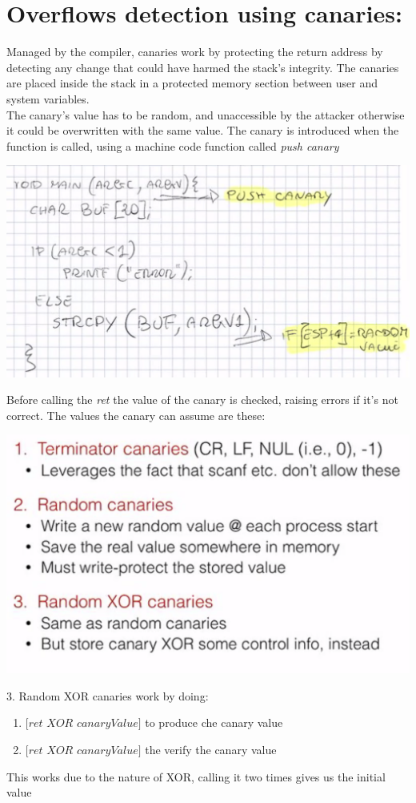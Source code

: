\documentclass[11pt, oneside]{article}   	%
\begin{document}
\section*{Overflows detection using canaries:}
Managed by the compiler, canaries work by protecting the return address by detecting any change that could have harmed the stack's integrity. The canaries are placed inside the stack in a protected memory section between user and system variables. \\The canary's value has to be random, and unaccessible by the attacker otherwise it could be overwritten with the same value.
The canary is introduced when the function is called, using a machine code function called \emph{push canary}
\begin{center}
\includegraphics[scale = 0.6]{pushcanary}
\end{center}
Before calling the \emph{ret} the value of the canary is checked, raising errors if it's not correct.
The values the canary can assume are these:
\begin{center}
\includegraphics[scale = 0.6]{values}
\end{center}
3. Random XOR canaries work by doing:
\begin{enumerate}
\item $[ret$ $XOR$ $canaryValue]$ to produce che canary value
\item $[ret$ $XOR$ $canaryValue]$ the verify the canary value
\end{enumerate}
This works due to the nature of XOR, calling it two times gives us the initial value
\end{document}
